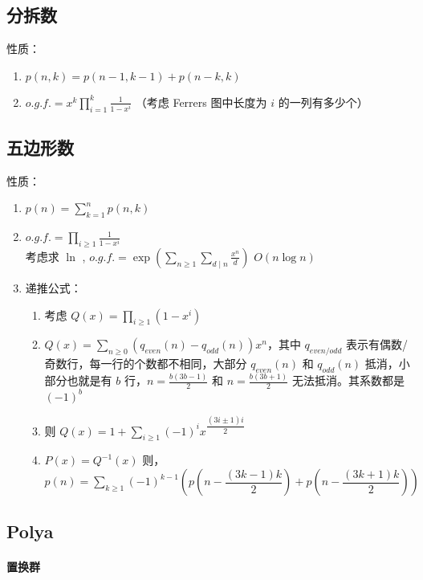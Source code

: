 \subsection{分拆数}

性质：
\begin{enumerate}
    \item $p(n,k)=p(n-1,k-1)+p(n-k,k)$
    \item $o.g.f. = x^k \prod\limits_{i=1}^k \frac{1}{1-x^i}$ （考虑 Ferrers 图中长度为 $i$ 的一列有多少个）
\end{enumerate}

\subsection{五边形数}

性质：
\begin{enumerate}
    \item $p(n)=\sum\limits_{k=1}^{n}p(n,k)$
    \item $o.g.f.=\prod\limits_{i\ge1}{\frac{1}{1-x^i}}$\\
    考虑求 $\ln$ , $o.g.f.=\exp(\sum_{n\ge1}{\sum_{d\mid n} {\frac{x^n}{d}}})$ $O(n\log{n})$
    \item 递推公式：
        \begin{enumerate}
            \item 考虑 $Q(x)=\prod_{i\ge1}(1-x^i)$
            \item $Q(x)=\sum_{n\ge0}(q_{even}(n)-q_{odd}(n))x^n，其中 $ $q_{even/odd}$ 表示有偶数/奇数行，每一行的个数都不相同，大部分 $q_{even}(n)$ 和 $q_{odd}(n)$ 抵消，小部分也就是有 $b$ 行，$n=\frac{b(3b-1)}{2}$ 和 $n=\frac{b(3b+1)}{2}$ 无法抵消。其系数都是 $(-1)^b$
            \item 则 $Q(x)=1+\sum_{i\ge1}(-1)^ix^{\dfrac{(3i\pm1)i}{2}}$
            \item $P(x)=Q^{-1}(x)$ 则，$p(n)=\sum_{k\ge1}(-1)^{k-1}\left(p\left(n-\dfrac{(3k-1)k}{2}\right)+p\left(n-\dfrac{(3k+1)k}{2}\right)\right)$
        \end{enumerate}
\end{enumerate}

\subsection{Polya}

\paragraph{置换群}\

